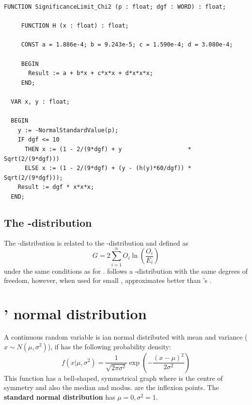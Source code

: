 \begin{refsection}
\begin{lstlisting}[caption= \( \chi^2 \) required]
  FUNCTION SignificanceLimit_Chi2 (p : float; dgf : WORD) : float;

     FUNCTION H (x : float) : float;

     CONST a = 1.886e-4; b = 9.243e-5; c = 1.590e-4; d = 3.080e-4;

     BEGIN
       Result := a + b*x + c*x*x + d*x*x*x;
     END;

  VAR x, y : float;

  BEGIN
    y := -NormalStandardValue(p);
    IF dgf <= 10
      THEN x := (1 - 2/(9*dgf) + y                   * Sqrt(2/(9*dgf)))
      ELSE x := (1 - 2/(9*dgf) + (y - (h(y)*60/dgf)) * Sqrt(2/(9*dgf)));
    Result := dgf * x*x*x;
  END;
\end{lstlisting}

\subsection{The -distribution}

The -distribution \parencite{Sok-81} is related to the -distribution and defined as
\begin{equation}
  G = 2 \sum_{i=1}^{n}{O_i \ln\left( \frac{O_i}{E_i} \right)}
\end{equation}
under the same conditions as for .  follows a -distribution with the same degrees of freedom, however, when used for small ,  approximates better than 's .

\section{' normal distribution}

A continuous random variable  is ian normal distributed with mean \skalar{\mu} and variance  (\( x \sim N(\mu, \sigma^2) \)), if  has the following probability density:
\begin{equation}
  f(x | \mu, \sigma^2) = \frac{1}{\sqrt{2\pi\sigma^2}} \exp\left( -\frac{(x-\mu)^2}{2\sigma^2} \right)
\end{equation}
This function has a bell-shaped, symmetrical  graph where \skalar{\mu} is the centre of symmetry and also the median and modus. \skalar{\mu\pm\sigma} are the inflexion points. The \textbf{standard normal distribution} has \( \mu = 0, \sigma^2 = 1\).


\end{refsection}
